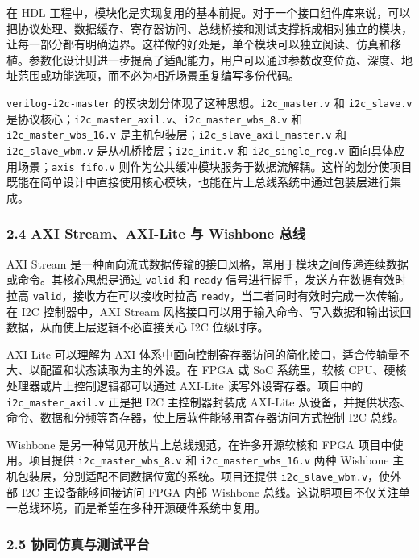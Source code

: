 在 HDL 工程中，模块化是实现复用的基本前提。对于一个接口组件库来说，可以把协议处理、数据缓存、寄存器访问、总线桥接和测试支撑拆成相对独立的模块，让每一部分都有明确边界。这样做的好处是，单个模块可以独立阅读、仿真和移植。参数化设计则进一步提高了适配能力，用户可以通过参数改变位宽、深度、地址范围或功能选项，而不必为相近场景重复编写多份代码。

\texttt{verilog-i2c-master} 的模块划分体现了这种思想。\texttt{i2c\_master.v} 和 \texttt{i2c\_slave.v} 是协议核心；\texttt{i2c\_master\_axil.v}、\texttt{i2c\_master\_wbs\_8.v} 和 \texttt{i2c\_master\_wbs\_16.v} 是主机包装层；\texttt{i2c\_slave\_axil\_master.v} 和 \texttt{i2c\_slave\_wbm.v} 是从机桥接层；\texttt{i2c\_init.v} 和 \texttt{i2c\_single\_reg.v} 面向具体应用场景；\texttt{axis\_fifo.v} 则作为公共缓冲模块服务于数据流解耦。这样的划分使项目既能在简单设计中直接使用核心模块，也能在片上总线系统中通过包装层进行集成。

\subsubsection{2.4 AXI Stream、AXI-Lite 与 Wishbone 总线}\label{axi-streamaxi-lite-ux4e0e-wishbone-ux603bux7ebf}

AXI Stream 是一种面向流式数据传输的接口风格，常用于模块之间传递连续数据或命令。其核心思想是通过 \texttt{valid} 和 \texttt{ready} 信号进行握手，发送方在数据有效时拉高 \texttt{valid}，接收方在可以接收时拉高 \texttt{ready}，当二者同时有效时完成一次传输。在 I2C 控制器中，AXI Stream 风格接口可以用于输入命令、写入数据和输出读回数据，从而使上层逻辑不必直接关心 I2C 位级时序。

AXI-Lite 可以理解为 AXI 体系中面向控制寄存器访问的简化接口，适合传输量不大、以配置和状态读取为主的外设。在 FPGA 或 SoC 系统里，软核 CPU、硬核处理器或片上控制逻辑都可以通过 AXI-Lite 读写外设寄存器。项目中的 \texttt{i2c\_master\_axil.v} 正是把 I2C 主控制器封装成 AXI-Lite 从设备，并提供状态、命令、数据和分频等寄存器，使上层软件能够用寄存器访问方式控制 I2C 总线。

Wishbone 是另一种常见开放片上总线规范，在许多开源软核和 FPGA 项目中使用。项目提供 \texttt{i2c\_master\_wbs\_8.v} 和 \texttt{i2c\_master\_wbs\_16.v} 两种 Wishbone 主机包装层，分别适配不同数据位宽的系统。项目还提供 \texttt{i2c\_slave\_wbm.v}，使外部 I2C 主设备能够间接访问 FPGA 内部 Wishbone 总线。这说明项目不仅关注单一总线环境，而是希望在多种开源硬件系统中复用。

\subsubsection{2.5 协同仿真与测试平台}\label{ux534fux540cux4effux771fux4e0eux6d4bux8bd5ux5e73ux53f0}

